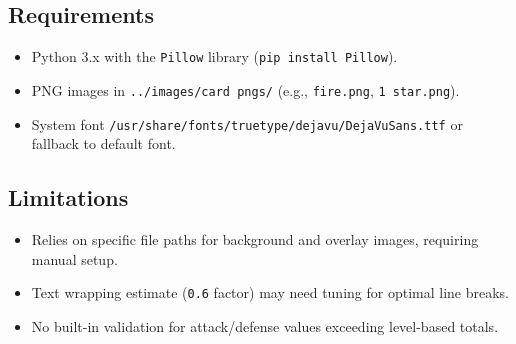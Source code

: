 \subsection{Requirements}
\begin{itemize}
	\item Python 3.x with the \texttt{Pillow} library (\texttt{pip install Pillow}).
	\item PNG images in \texttt{../images/card pngs/} (e.g., \texttt{fire.png}, \texttt{1 star.png}).
	\item System font \texttt{/usr/share/fonts/truetype/dejavu/DejaVuSans.ttf} or fallback to default font.
\end{itemize}

\subsection{Limitations}
\begin{itemize}
	\item Relies on specific file paths for background and overlay images, requiring manual setup.
	\item Text wrapping estimate (\texttt{0.6} factor) may need tuning for optimal line breaks.
	\item No built-in validation for attack/defense values exceeding level-based totals.
\end{itemize}












